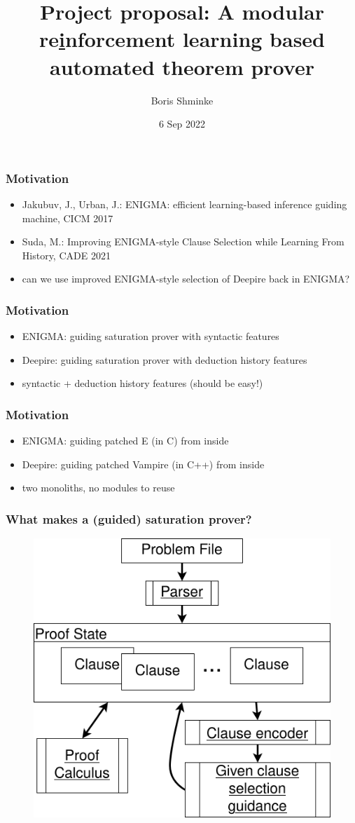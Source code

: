 \documentclass{beamer}
\title{Project proposal: A modular re\href{https://bit.ly/3ccTbKv}{i}nforcement learning based automated theorem prover}
\author{Boris Shminke}
\institute{Laboratoire J.A. Dieudonn\'e, CNRS, and Universit\'e C\^ote d'Azur, France}
\date{6 Sep 2022}
\begin{document}
\begin{frame}
\titlepage
\end{frame}
\begin{frame}[t]
\frametitle{Motivation}
\begin{itemize}
\item Jakubuv, J., Urban, J.: ENIGMA: efficient learning-based inference guiding machine, CICM 2017
\item Suda, M.: Improving ENIGMA-style Clause Selection while Learning From History, CADE 2021
\item can we use improved ENIGMA-style selection of Deepire back in ENIGMA?
\end{itemize}
\end{frame}
\begin{frame}[t]
\frametitle{Motivation}
\begin{itemize}
\item ENIGMA: guiding saturation prover with syntactic features
\item Deepire: guiding saturation prover with deduction history features
\item syntactic + deduction history features (should be easy!)
\end{itemize}
\end{frame}
\begin{frame}[t]
\frametitle{Motivation}
\begin{itemize}
\item ENIGMA: guiding patched E (in C) from inside
\item Deepire: guiding patched Vampire (in C++) from inside
\item two monoliths, no modules to reuse
\end{itemize}
\end{frame}
\begin{frame}[t]
\frametitle{What makes a (guided) saturation prover?}
\begin{figure}
\includegraphics[scale=0.2]{SaturationProver}
\end{figure}
\end{frame}
\end{document}
